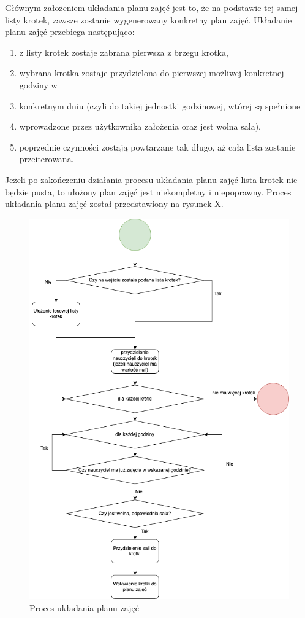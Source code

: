     Głównym założeniem układania planu zajęć jest to, że na podstawie tej samej listy krotek, zawsze zostanie wygenerowany konkretny plan zajęć. 
Układanie planu zajęć przebiega następująco:
\begin{enumerate}
	\item z listy krotek zostaje zabrana pierwsza z brzegu krotka,
	\item wybrana krotka zostaje przydzielona do pierwszej możliwej konkretnej godziny w 		\item konkretnym dniu (czyli do takiej jednostki godzinowej, wtórej są spełnione 			\item wprowadzone przez użytkownika założenia oraz jest wolna sala),
	\item poprzednie czynności zostają powtarzane tak długo, aż cała lista zostanie przeiterowana.
\end{enumerate}
Jeżeli po zakończeniu działania procesu układania planu zajęć lista krotek nie będzie pusta, to ułożony plan zajęć jest niekompletny i niepoprawny. Proces układania planu zajęć został przedstawiony na rysunek X.

\begin{figure}[h]
\centering\includegraphics[width=\textwidth]{figures/time_table_prep}
\caption{Proces układania planu zajęć}\label{rys:time_table_prep}
\end{figure}

